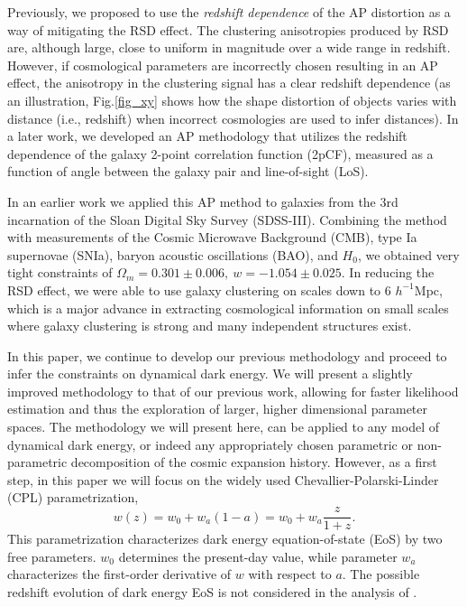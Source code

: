 \documentclass[iop]{emulateapj}
\begin{document}
Previously, we proposed to use the {\it redshift dependence} of the AP distortion\cite{Li2014} as a way of mitigating the RSD effect. The clustering anisotropies produced by RSD are, although large, close to uniform in magnitude over a wide range in redshift.  However, if cosmological parameters are incorrectly chosen resulting in an AP effect, 
the anisotropy in the clustering signal has a clear redshift dependence
(as an illustration, Fig.\ref{fig_xy} shows how the shape distortion of objects varies with distance (i.e., redshift) 
when incorrect cosmologies are used to infer distances).
In a later work\cite{Li2015}, we developed an AP methodology 
that utilizes the redshift dependence of the galaxy 2-point correlation function (2pCF), 
measured as a function of angle between the galaxy pair and line-of-sight (LoS).


In an earlier work\citep{Li2016} we applied this AP method to galaxies from the 3rd incarnation of the Sloan Digital Sky Survey (SDSS-III). 
Combining the method with measurements of the Cosmic Microwave Background (CMB), type Ia supernovae (SNIa), 
baryon acoustic oscillations (BAO), and $H_0$,
we obtained very tight constraints of $ \Omega_m = 0.301 \pm 0.006,\ w=-1.054 \pm 0.025$.
In reducing the RSD effect, 
we were able to use galaxy clustering on scales down to 6 $h^{-1}$Mpc,
which is a major advance in extracting cosmological information 
on small scales where galaxy clustering is strong and many independent structures exist.



In this paper, we continue to develop our previous methodology and proceed to infer the constraints on dynamical dark energy. 
We will present a slightly improved methodology to that of our previous work\citep{Li2016}, 
allowing for faster likelihood estimation and thus the exploration of larger, higher dimensional parameter spaces. 
The methodology we will present here, can be applied to any model of dynamical dark energy, 
or indeed any appropriately chosen parametric or non-parametric decomposition of the cosmic expansion history. 
However, as a first step, in this paper we will focus on the widely used Chevallier-Polarski-Linder (CPL) parametrization\cite{CPL_CP,CPL_L},
\begin{equation}
w(z) = w_0 + w_a (1-a) = w_0 + w_a \frac{z}{1+z}.
\end{equation}
This parametrization characterizes dark energy equation-of-state (EoS) by two free parameters.
$w_0$ determines the present-day value, while parameter $w_a$ characterizes the first-order derivative of $w$ with respect to $a$. 
The possible redshift evolution of dark energy EoS is not considered in the analysis of \cite{Li2016}. 
\end{document}
